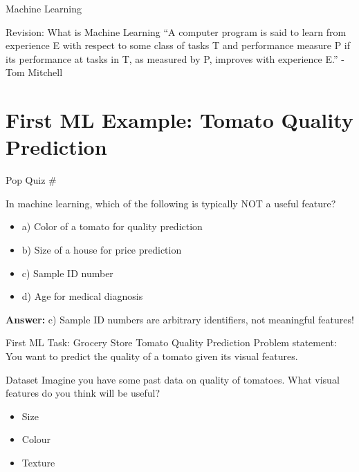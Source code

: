 \documentclass[usenames,dvipsnames]{beamer}
\begin{document}
\begin{frame}{Machine Learning}
\end{frame}

\begin{frame}{Revision: What is Machine Learning}
``A computer program is said to learn from
experience E with respect to some class of tasks T
and performance measure P if its performance at
tasks in T, as measured by P, improves with
experience E.'' - Tom Mitchell
\end{frame}

\section{First ML Example: Tomato Quality Prediction}

\begin{frame}{Pop Quiz \#\thepopquiz}
\begin{popquizbox}{\thepopquiz}
In machine learning, which of the following is typically NOT a useful feature?
\begin{itemize}
	\item a) Color of a tomato for quality prediction
	\item b) Size of a house for price prediction  
	\item c) Sample ID number
	\item d) Age for medical diagnosis
\end{itemize}
\pause
\textbf{Answer:} c) Sample ID numbers are arbitrary identifiers, not meaningful features!
\end{popquizbox}
\end{frame}

\begin{frame}{First ML Task: Grocery Store Tomato Quality Prediction}
Problem statement: You want to predict the quality of a tomato given its visual features.
\end{frame}

\begin{frame}{Dataset}
Imagine you have some past data on quality of tomatoes. What visual features do you think will be useful?

\begin{itemize}
	\item \pause Size
	\item \pause Colour
	\item \pause Texture
\end{itemize}
\end{frame}
  
\end{document}
